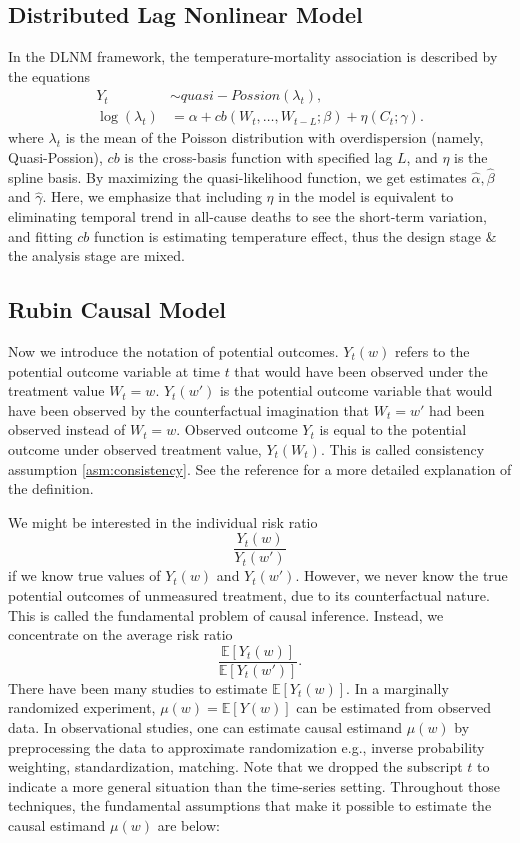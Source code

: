\documentclass[12pt]{article}
\begin{document}
\subsection{Distributed Lag Nonlinear Model}
\label{section:dlnm}

In the DLNM framework,
the temperature-mortality association is described by the equations
\[
	\begin{split}
		Y_t &\sim quasi-Possion(\lambda_t), \\
		\log(\lambda_t) &= \alpha + cb(W_t, \dots, W_{t-L};\beta) + \eta(C_t; \gamma).
	\end{split}
\]
where $\lambda_t$ is the mean of 
the Poisson distribution with overdispersion (namely, Quasi-Possion\cite{quasipoisson}),
$cb$ is the cross-basis function with specified lag $L$,
and $\eta$ is the spline basis.
By maximizing the quasi-likelihood function, 
we get estimates $\hat{\alpha}, \hat{\beta}$ and $\hat{\gamma}$.
Here, we emphasize that 
including $\eta$ in the model is equivalent to eliminating temporal trend in all-cause deaths
to see the short-term variation,
and fitting $cb$ function is estimating temperature effect,
thus the design stage \& the analysis stage are mixed.


\subsection{Rubin Causal Model}
\label{section:rcm}

Now we introduce the notation of potential outcomes.
$Y_t(w)$ refers to the potential outcome variable at time $t$
that would have been observed under the treatment value $W_t = w$.
$Y_t(w')$ is the potential outcome variable 
that would have been observed by the counterfactual imagination
that $W_t = w'$ had been observed instead of $W_t = w$.
Observed outcome $Y_t$ is equal to the potential outcome under observed treatment value, $Y_t(W_t)$.
This is called consistency assumption \ref{asm:consistency}.
See the reference\cite{whatif2020} for a more detailed explanation of the definition.

We might be interested in the individual risk ratio
\[
	\frac{Y_t(w)}{Y_t(w')}
\]
if we know true values of $Y_t(w)$ and $Y_t(w')$.
However, we never know the true potential outcomes of unmeasured treatment, 
due to its counterfactual nature.
This is called the fundamental problem of causal inference\cite{holland1986}.
Instead, we concentrate on the average risk ratio
\[
	\frac{\mathbb{E}\left[ Y_t(w) \right]}{\mathbb{E}\left[ Y_t(w') \right]}.
\]
There have been many studies to estimate $\mathbb{E}[Y_t(w)]$.
In a marginally randomized experiment, 
$\mu(w) = \mathbb{E}[Y(w)]$ can be estimated from observed data\cite{rubin1974}.
In observational studies, 
one can estimate causal estimand $\mu(w)$ by preprocessing the data to approximate randomization 
e.g., inverse probability weighting, standardization, matching\cite{rosenbaum1983}.
Note that we dropped the subscript $t$ to indicate a more general situation than the time-series setting.
Throughout those techniques, 
the fundamental assumptions that make it possible to estimate the causal estimand $\mu(w)$ are below:
\end{document}
